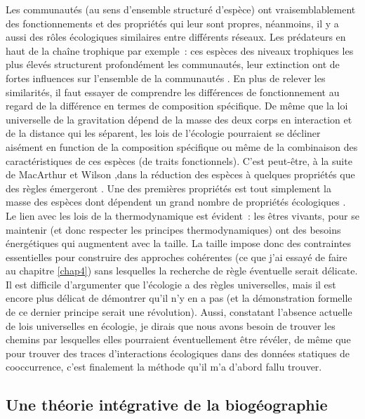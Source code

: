 Les communautés (au sens d'ensemble structuré d'espèce) ont
vraisemblablement des fonctionnements et des propriétés qui leur sont
propres, néanmoins, il y a aussi des rôles écologiques similaires entre
différents réseaux. Les prédateurs en haut de la chaîne trophique par
exemple~: ces espèces des niveaux trophiques les plus élevés structurent
profondément les communautés, leur extinction ont de fortes influences
sur l'ensemble de la communautés
\citep{Terborgh2001, Sinclair2003a, Myers2007, Ripple2014}. En plus de
relever les similarités, il faut essayer de comprendre les différences
de fonctionnement au regard de la différence en termes de composition
spécifique. De même que la loi universelle de la gravitation dépend de
la masse des deux corps en interaction et de la distance qui les
séparent, les lois de l'écologie pourraient se décliner aisément en
function de la composition spécifique ou même de la combinaison des
caractéristiques de ces espèces (de traits fonctionnels). C'est
peut-être, à la suite de MacArthur et Wilson \citep{MacArthur1967},dans
la réduction des espèces à quelques propriétés que des règles émergeront
\citep{McGill2006, Poisot2015}. Une des premières propriétés est tout
simplement la masse des espèces dont dépendent un grand nombre de
propriétés écologiques \citep{Woodward2005a}. Le lien avec les lois de
la thermodynamique est évident~: les êtres vivants, pour se maintenir
(et donc respecter les principes thermodynamiques) ont des besoins
énergétiques qui augmentent avec la taille. La taille impose donc des
contraintes essentielles pour construire des approches cohérentes (ce
que j'ai essayé de faire au chapitre \ref{chap4}) sans lesquelles la
recherche de règle éventuelle serait délicate. Il est difficile
d'argumenter que l'écologie a des règles universelles, mais il est
encore plus délicat de démontrer qu'il n'y en a pas (et la démonstration
formelle de ce dernier principe serait une révolution). Aussi,
constatant l'absence actuelle de lois universelles en écologie, je
dirais que nous avons besoin de trouver les chemins par lesquelles elles
pourraient éventuellement être révéler, de même que pour trouver des
traces d'interactions écologiques dans des données statiques de
cooccurrence, c'est finalement la méthode qu'il m'a d'abord fallu
trouver.

\subsection*{Une théorie intégrative de la
biogéographie}\label{une-thuxe9orie-intuxe9grative-de-la-bioguxe9ographie}

